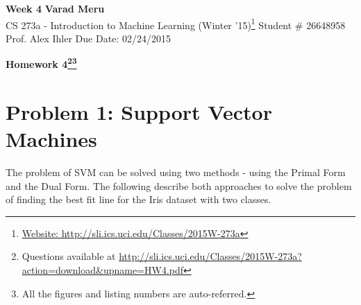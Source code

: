 \documentclass[a4paper, 11pt]{article}
\begin{document}
\begin{noindent}
\large\textbf{Week 4} \hfill \textbf{Varad Meru} \\
\normalsize CS 273a - Introduction to Machine Learning (Winter '15)\footnote{\href{http://sli.ics.uci.edu/Classes/2015W-273a}{Website: http://sli.ics.uci.edu/Classes/2015W-273a}} \hfill Student \# 26648958 \\
Prof. Alex Ihler \hfill Due Date: 02/24/2015
\end{noindent}	
\noindent\makebox[\linewidth]{\rule{\textwidth}{0.4pt}}

\begin{center}
\textbf{\Large{Homework 4}\footnote{Questions available at \href{http://sli.ics.uci.edu/Classes/2015W-273a?action=download\&upname=HW4.pdf}{http://sli.ics.uci.edu/Classes/2015W-273a?action=download\&upname=HW4.pdf}}\footnote{All the figures and listing numbers are auto-referred.}}\\
\end{center}
\vspace{-25pt}

\section*{Problem 1: Support Vector Machines}
The problem of SVM can be solved using two methods - using the Primal Form and the Dual Form. The following describe both approaches to solve the problem of finding the best fit line for the Iris dataset with two classes.
\end{document}
